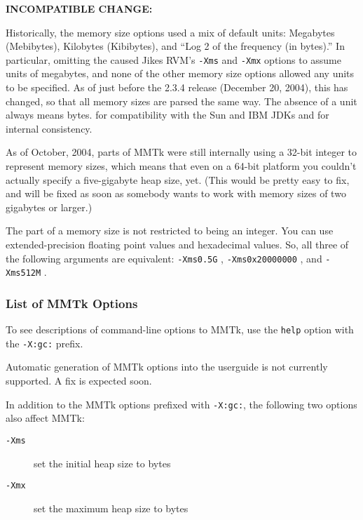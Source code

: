       \textbf{INCOMPATIBLE CHANGE:} %
      \begin{small}
      Historically, the memory size options used a mix of default
      units: Megabytes (Mebibytes), Kilobytes (Kibibytes), and ``Log 2 of the frequency (in bytes).''  
      In particular, omitting the  caused Jikes RVM's \texttt{-Xms}
      and \texttt{-Xmx} options to assume units of megabytes, and none of
      the other memory size options allowed any units to be
      specified.  As
      of just before the 2.3.4 release (December 20, 2004), this has
      changed, so that all memory sizes are parsed the same way.  The
      absence of a unit always means bytes. for compatibility
      with the Sun and IBM JDKs and for internal consistency.
      \end{small}

      As of October, 2004, parts of MMTk were still internally using a
      32-bit integer to represent memory sizes, which means that even on a
      64-bit platform you couldn't actually specify a five-gigabyte heap size,
      yet.  {\small (This would be pretty easy to fix, and will be fixed as soon as
      somebody wants to work with memory sizes of two gigabytes or larger.)}

      The  part of a memory size is not restricted to being an
      integer.  You can use extended-precision floating point values and
      hexadecimal values.  So, all three of the following arguments are
      equivalent:
      \texttt{-Xms0.5G} , \texttt{-Xms0x20000000} , and \texttt{-Xms512M} .


\subsubsection{List of MMTk Options}


To see descriptions of command-line options to MMTk,
use the {\tt help} option with the {\tt -X:gc:} prefix.

Automatic generation of MMTk options into the userguide is not
currently supported.  A fix is expected soon.

\T \begin{tiny}
%
\T \end{tiny}

In addition to the MMTk options prefixed with {\tt -X:gc:}, the
following two options also affect MMTk:

\begin{description}

\item[{\tt -Xms\Mlsq{}\Mrsq{}}]
set the initial heap size to \Mlsq{}\Mrsq{} bytes

\item[{\tt -Xmx\Mlsq{}\Mrsq{}}]
set the maximum heap size to \Mlsq{}\Mrsq{} bytes

\end{description}



